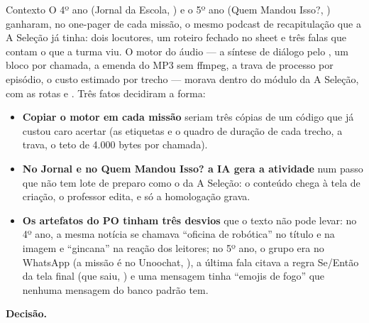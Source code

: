 \begin{especificacao}{Contexto}
O 4º ano (Jornal da Escola, ) e o 5º ano (Quem Mandou Isso?,
) ganharam, no one-pager de cada missão, o mesmo podcast de
recapitulação que a A Seleção já tinha: dois locutores, um roteiro fechado no
sheet e três falas que contam o que a turma viu. O motor do áudio --- a
síntese de diálogo pelo , um bloco por chamada, a emenda
do MP3 sem ffmpeg, a trava de processo por episódio, o custo estimado por
trecho --- morava dentro do módulo da A Seleção, com as rotas
 e . Três fatos
decidiram a forma:

\begin{itemize}
  \item \textbf{Copiar o motor em cada missão} seriam três cópias de um código
    que já custou caro acertar (as etiquetas e o quadro de duração de cada
    trecho, a trava, o teto de 4.000 bytes por chamada).
  \item \textbf{No Jornal e no Quem Mandou Isso? a IA gera a atividade} num
    passo que não tem lote de preparo como o da A Seleção: o conteúdo chega à
    tela de criação, o professor edita, e só a homologação grava.
  \item \textbf{Os artefatos do PO tinham três desvios} que o texto não pode
    levar: no 4º ano, a mesma notícia se chamava \enquote{oficina de robótica}
    no título e na imagem e \enquote{gincana} na reação dos leitores; no 5º
    ano, o grupo era no WhatsApp (a missão é no Unoochat, ), a
    última fala citava a regra Se/Então da tela final (que saiu,
    ) e uma mensagem tinha \enquote{emojis de fogo} que nenhuma
    mensagem do banco padrão tem.
\end{itemize}
\end{especificacao}

\textbf{Decisão.}

